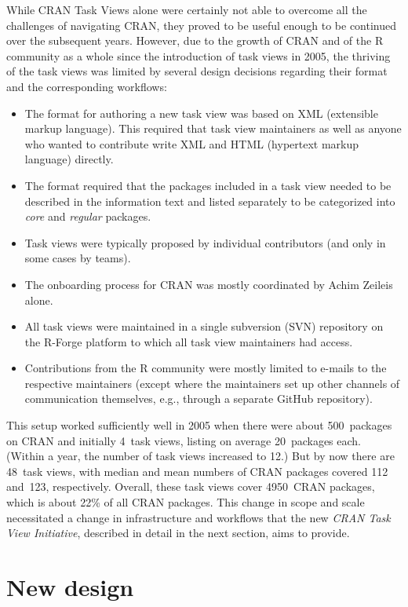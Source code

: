 While CRAN Task Views alone were certainly not able to overcome all the challenges of
navigating CRAN, they proved to be useful enough to be continued over the subsequent
years. However, due to the growth of CRAN \citep[see, e.g.,][]{cran} and of the R community as a whole
since the introduction of task views in 2005, the thriving of the task views
was limited by several design decisions regarding their format and the corresponding
workflows:

\begin{itemize}
\tightlist
\item
  The format for authoring a new task view was based on XML (extensible markup
  language). This required that task view maintainers as well as anyone who wanted to
  contribute write XML and HTML (hypertext markup language) directly.
\item
  The format required that the packages included in a task view needed to be
  described in the information text and listed separately to be categorized
  into \emph{core} and \emph{regular} packages.
\item
  Task views were typically proposed by individual contributors (and only in some cases
  by teams).
\item
  The onboarding process for CRAN was mostly coordinated by Achim Zeileis alone.
\item
  All task views were maintained in a single subversion (SVN) repository on the
  R-Forge platform \citep{rforge} to which all task view maintainers had access.
\item
  Contributions from the R community were mostly limited to e-mails to the respective
  maintainers (except where the maintainers set up other channels of communication
  themselves, e.g., through a separate GitHub repository).
\end{itemize}

This setup worked sufficiently well in 2005 when there were about 500~packages on CRAN and
initially 4~task views, listing on average 20~packages each. (Within a year, the
number of task views increased to 12.)
But by now there are 48~task views, with median and mean numbers of CRAN
packages covered 112 and~123, respectively.
Overall, these task views cover 4950~CRAN packages,
which is about 22\% of all CRAN packages.
This change in scope and scale necessitated a change in infrastructure and workflows
that the new \emph{CRAN Task View Initiative}, described in detail in the next section,
aims to provide.

\section{New design}\label{new-design}

